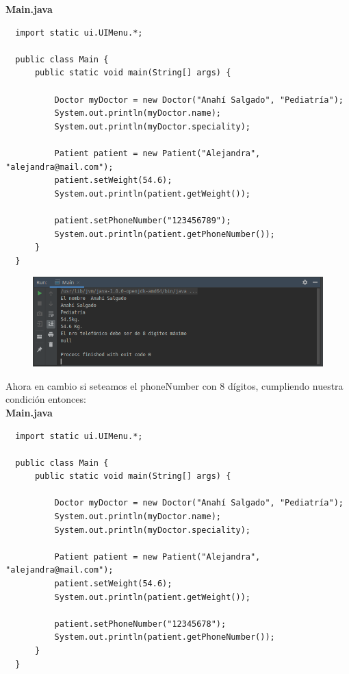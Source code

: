 \documentclass{article}
\begin{document}
\textbf{Main.java}
\begin{verbatim}
  import static ui.UIMenu.*;

  public class Main {
      public static void main(String[] args) {

          Doctor myDoctor = new Doctor("Anahí Salgado", "Pediatría");
          System.out.println(myDoctor.name);
          System.out.println(myDoctor.speciality);

          Patient patient = new Patient("Alejandra", "alejandra@mail.com");
          patient.setWeight(54.6);
          System.out.println(patient.getWeight());

          patient.setPhoneNumber("123456789");
          System.out.println(patient.getPhoneNumber());
      }
  }
\end{verbatim}

\begin{figure}[h!]
  \centering
  \includegraphics[scale=0.75]{./Pictures/036_set_get.png}
\end{figure}

\newpage

Ahora en cambio si seteamos el phoneNumber con 8 dígitos, cumpliendo nuestra
condición entonces:\\

\textbf{Main.java}
\begin{verbatim}
  import static ui.UIMenu.*;

  public class Main {
      public static void main(String[] args) {

          Doctor myDoctor = new Doctor("Anahí Salgado", "Pediatría");
          System.out.println(myDoctor.name);
          System.out.println(myDoctor.speciality);

          Patient patient = new Patient("Alejandra", "alejandra@mail.com");
          patient.setWeight(54.6);
          System.out.println(patient.getWeight());

          patient.setPhoneNumber("12345678");
          System.out.println(patient.getPhoneNumber());
      }
  }
\end{verbatim}
\end{document}
